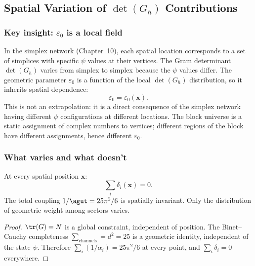 \subsection{Spatial Variation of $\det(G_h)$ Contributions}

\subsubsection{Key insight: $\varepsilon_0$ is a local field}

In the simplex network (Chapter~10), each spatial location corresponds to a set of simplices with specific $\psi$ values at their vertices. The Gram determinant $\det(G_h)$ varies from simplex to simplex because the $\psi$ values differ. The geometric parameter $\varepsilon_0$ is a function of the local $\det(G_h)$ distribution, so it inherits spatial dependence:
\begin{equation}
\varepsilon_0 = \varepsilon_0(\mathbf{x}).
\end{equation}
This is not an extrapolation: it is a direct consequence of the simplex network having different $\psi$ configurations at different locations. The block universe is a static assignment of complex numbers to vertices; different regions of the block have different assignments, hence different $\varepsilon_0$.

\subsubsection{What varies and what doesn't}

\begin{theorem}
At every spatial position $\mathbf{x}$:
\begin{equation}
\sum_i \delta_i(\mathbf{x}) = 0.
\end{equation}
The total coupling $1/\agut = 25\pi^2/6$ is spatially invariant. Only the distribution of geometric weight among sectors varies.
\end{theorem}

\begin{proof}
$\tr(G) = N$ is a global constraint, independent of position. The Binet--Cauchy completeness $\sum_\text{channels} = d^2 = 25$ is a geometric identity, independent of the state $\psi$. Therefore $\sum_i(1/\alpha_i) = 25\pi^2/6$ at every point, and $\sum_i \delta_i = 0$ everywhere.
\end{proof}

